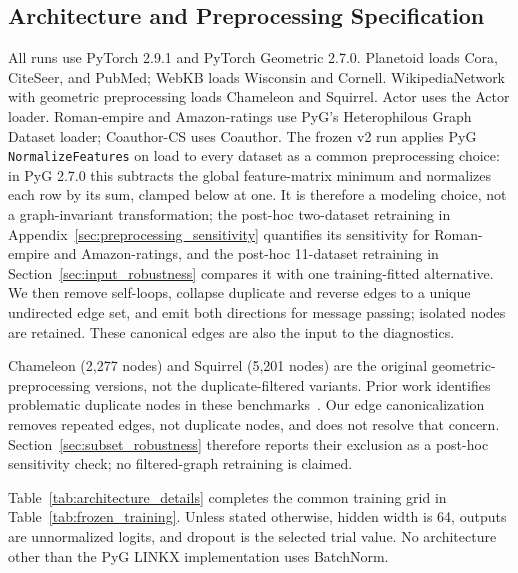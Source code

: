 \subsection{Architecture and Preprocessing Specification}

All runs use PyTorch 2.9.1 and PyTorch Geometric 2.7.0. Planetoid loads Cora, CiteSeer, and PubMed; WebKB loads Wisconsin and Cornell. WikipediaNetwork with geometric preprocessing loads Chameleon and Squirrel. Actor uses the Actor loader. Roman-empire and Amazon-ratings use PyG's Heterophilous Graph Dataset loader; Coauthor-CS uses Coauthor. The frozen v2 run applies PyG \texttt{NormalizeFeatures} on load to every dataset as a common preprocessing choice: in PyG 2.7.0 this subtracts the global feature-matrix minimum and normalizes each row by its sum, clamped below at one. It is therefore a modeling choice, not a graph-invariant transformation; the post-hoc two-dataset retraining in Appendix~\ref{sec:preprocessing_sensitivity} quantifies its sensitivity for Roman-empire and Amazon-ratings, and the post-hoc 11-dataset retraining in Section~\ref{sec:input_robustness} compares it with one training-fitted alternative. We then remove self-loops, collapse duplicate and reverse edges to a unique undirected edge set, and emit both directions for message passing; isolated nodes are retained. These canonical edges are also the input to the diagnostics.

Chameleon (2,277 nodes) and Squirrel (5,201 nodes) are the original geometric-preprocessing versions, not the duplicate-filtered variants. Prior work identifies problematic duplicate nodes in these benchmarks~\citep{platonov2023heterophilous}. Our edge canonicalization removes repeated edges, not duplicate nodes, and does not resolve that concern. Section~\ref{sec:subset_robustness} therefore reports their exclusion as a post-hoc sensitivity check; no filtered-graph retraining is claimed.

Table~\ref{tab:architecture_details} completes the common training grid in Table~\ref{tab:frozen_training}. Unless stated otherwise, hidden width is 64, outputs are unnormalized logits, and dropout is the selected trial value. No architecture other than the PyG LINKX implementation uses BatchNorm.

